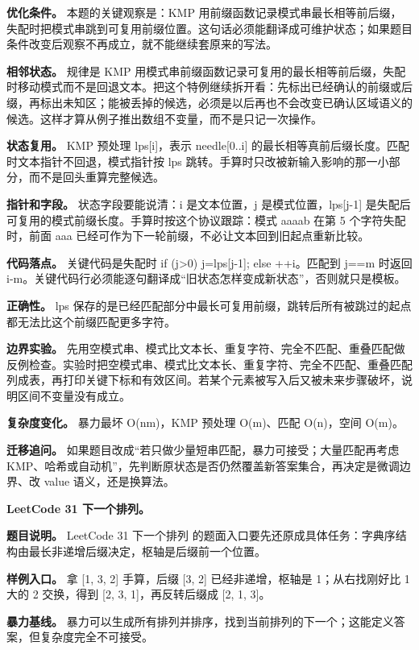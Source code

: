 \textbf{优化条件。} 本题的关键观察是：KMP 用前缀函数记录模式串最长相等前后缀，失配时把模式串跳到可复用前缀位置。这句话必须能翻译成可维护状态；如果题目条件改变后观察不再成立，就不能继续套原来的写法。

\textbf{相邻状态。} 规律是 KMP 用模式串前缀函数记录可复用的最长相等前后缀，失配时移动模式而不是回退文本。把这个特例继续拆开看：先标出已经确认的前缀或后缀，再标出未知区；能被丢掉的候选，必须是以后再也不会改变已确认区域语义的候选。这样才算从例子推出数组不变量，而不是只记一次操作。

\textbf{状态复用。} KMP 预处理 lps[i]，表示 needle[0..i] 的最长相等真前后缀长度。匹配时文本指针不回退，模式指针按 lps 跳转。手算时只改被新输入影响的那一小部分，而不是回头重算完整候选。

\textbf{指针和字段。} 状态字段要能说清：i 是文本位置，j 是模式位置，lps[j-1] 是失配后可复用的模式前缀长度。手算时按这个协议跟踪：模式 aaaab 在第 5 个字符失配时，前面 aaa 已经可作为下一轮前缀，不必让文本回到旧起点重新比较。

\textbf{代码落点。} 关键代码是失配时 if (j>0) j=lps[j-1]; else ++i。匹配到 j==m 时返回 i-m。关键代码行必须能逐句翻译成“旧状态怎样变成新状态”，否则就只是模板。

\textbf{正确性。} lps 保存的是已经匹配部分中最长可复用前缀，跳转后所有被跳过的起点都无法比这个前缀匹配更多字符。

\textbf{边界实验。} 先用空模式串、模式比文本长、重复字符、完全不匹配、重叠匹配做反例检查。实验时把空模式串、模式比文本长、重复字符、完全不匹配、重叠匹配列成表，再打印关键下标和有效区间。若某个元素被写入后又被未来步骤破坏，说明区间不变量没有成立。

\textbf{复杂度变化。} 暴力最坏 O(nm)，KMP 预处理 O(m)、匹配 O(n)，空间 O(m)。

\textbf{迁移追问。} 如果题目改成“若只做少量短串匹配，暴力可接受；大量匹配再考虑 KMP、哈希或自动机”，先判断原状态是否仍然覆盖新答案集合，再决定是微调边界、改 value 语义，还是换算法。

\noindent\textbf{LeetCode 31 下一个排列。}

\textbf{题目说明。} LeetCode 31 下一个排列 的题面入口要先还原成具体任务：字典序结构由最长非递增后缀决定，枢轴是后缀前一个位置。

\textbf{样例入口。} 拿 [1, 3, 2] 手算，后缀 [3, 2] 已经非递增，枢轴是 1；从右找刚好比 1 大的 2 交换，得到 [2, 3, 1]，再反转后缀成 [2, 1, 3]。

\textbf{暴力基线。} 暴力可以生成所有排列并排序，找到当前排列的下一个；这能定义答案，但复杂度完全不可接受。

